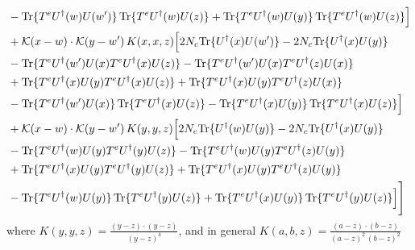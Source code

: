 \documentclass[9pt]{article}
\numberwithin{equation}{section}
\begin{document}
\begin{align}
&-{\rm Tr}\{T^eU^\dagger(w)U(w')\}\,{\rm Tr}\{T^eU^\dagger(w)U(z)\}+{\rm Tr}\{T^eU^\dagger(w)U(y)\}\,{\rm Tr}\{T^eU^\dagger(w)U(z)\}\Big]\notag\\
&+\mathcal K(x-w)\cdot\mathcal K(y-w')\,K(x,x,z)\Big[2 N_{c}{\rm Tr}\{U^\dagger(x)U(w')\}-2 N_{c}{\rm Tr}\{U^\dagger(x)U(y)\}\notag\\
&-{\rm Tr}\{T^eU^\dagger(w')U(x)T^eU^\dagger(x)U(z)\}-{\rm Tr}\{T^eU^\dagger(w')U(x)T^eU^\dagger(z)U(x)\}\notag\\
&+{\rm Tr}\{T^eU^\dagger(x)U(y)T^eU^\dagger(x)U(z)\}+{\rm Tr}\{T^eU^\dagger(x)U(y)T^eU^\dagger(z)U(x)\}\notag\\
&-{\rm Tr}\{T^eU^\dagger(w')U(x)\}\,{\rm Tr}\{T^eU^\dagger(x)U(z)\}-{\rm Tr}\{T^eU^\dagger(x)U(y)\}\,{\rm Tr}\{T^eU^\dagger(x)U(z)\}\Big]\notag\\
&+\mathcal K(x-w)\cdot\mathcal K(y-w')\,K(y,y,z)\Big[2 N_{c}{\rm Tr}\{U^\dagger(w)U(y)\}-2 N_{c}{\rm Tr}\{U^\dagger(x)U(y)\}\notag\\
&-{\rm Tr}\{T^eU^\dagger(w)U(y)T^eU^\dagger(y)U(z)\}-{\rm Tr}\{T^eU^\dagger(w)U(y)T^eU^\dagger(z)U(y)\}\notag\\
&+{\rm Tr}\{T^eU^\dagger(x)U(y)T^eU^\dagger(y)U(z)\}+{\rm Tr}\{T^eU^\dagger(x)U(y)T^eU^\dagger(z)U(y)\}\notag\\
&-{\rm Tr}\{T^eU^\dagger(w)U(y)\}\,{\rm Tr}\{T^eU^\dagger(y)U(z)\}+{\rm Tr}\{T^eU^\dagger(x)U(y)\}\,{\rm Tr}\{T^eU^\dagger(y)U(z)\}\Big]\Bigg]
\end{align}
where $K(y,y,z) = \frac{(y-z)\cdot (y-z)}{(y-z)^{4}}$, and in general $K(a,b,z)=\frac{(a-z)\cdot(b-z)}{(a-z)^{2}\,(b-z)^{2}}$
\end{document}
